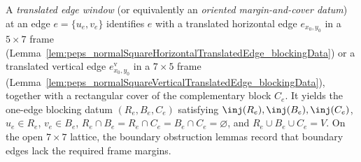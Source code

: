 \begin{definition}
    \leanok
    A \emph{translated edge window} (or equivalently an \emph{oriented
        margin-and-cover datum}) at an edge $e=\{u_e,v_e\}$ identifies $e$ with a
    translated horizontal edge $e_{x_0,y_0}$ in a $5\times 7$ frame
    (Lemma~\ref{lem:peps_normalSquareHorizontalTranslatedEdge_blockingData}) or
    a translated vertical edge $e^{\mathrm v}_{x_0,y_0}$ in a $7\times 5$ frame
    (Lemma~\ref{lem:peps_normalSquareVerticalTranslatedEdge_blockingData}),
    together with a rectangular cover of the complementary block $C_e$. It
    yields the one-edge blocking datum $(R_e,B_e,C_e)$ satisfying
    $\inj(R_e),\inj(B_e),\inj(C_e)$, $u_e\in R_e$, $v_e\in B_e$,
    $R_e\cap B_e=R_e\cap C_e=B_e\cap C_e=\varnothing$, and
    $R_e\cup B_e\cup C_e=V$. On the open $7\times 7$ lattice, the boundary
    obstruction lemmas record that boundary edges lack the required frame
    margins.
\end{definition}

